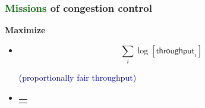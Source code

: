 \documentclass[svgnames]{beamer}
\begin{document}
\begin{frame}
\frametitle{\textbf{\textcolor{DarkGreen}{Missions}} of congestion control}

\textbf{Maximize}

\begin{itemize}

\item \begin{minipage}{3.75 cm}
\[\sum_i \log \left[ \textsf{throughput}_i \right]\]
\end{minipage} \textsf{\textcolor{DarkBlue}{(proportionally fair throughput)}}

\pause

\item
\begin{minipage}{3.75 cm}
\begin{tabular}{l}
\cellcolor{Bisque}\raisebox{0.75 cm}{\begin{minipage}{3.75 cm}
\[\sum_i \log \left[ \frac{\textsf{throughput}_i}{\visible<3->{
\textcolor{DarkBlue}{\big(}
}\textsf{delay}_i\visible<3->{
\textcolor{DarkBlue}{\big)^{\bm \delta}}}} \right]\]
\end{minipage} \textsf{\textcolor{DarkBlue}{(proportionally fair throughput/delay)}}}
\end{tabular}
\end{minipage}

\end{itemize}

\vspace{\baselineskip}


\end{frame}
\end{document}

